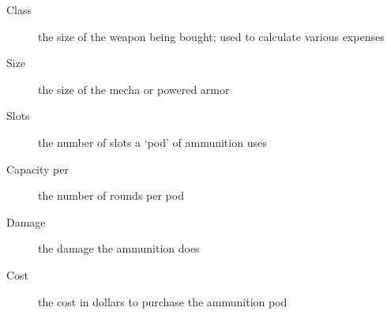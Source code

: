 \documentclass[twoside]{book}
\begin{document}
\begin{description}
    
  \item[ Class ] 
    {  
      the size of the weapon being bought; used to
                 calculate various expenses 
    }
  
  \item[ Size ] 
    {  
      the size of the mecha or powered armor 
    }
  
  \item[ Slots ] 
    {  
      the number of slots a `pod' of
                 ammunition uses 
    }
  
  \item[ Capacity per ] 
    {  
      the number of rounds per pod 
    }
  
  \item[ Damage ] 
    {  
      the damage the ammunition does 
    }
  
  \item[ Cost ] 
    {  
      the cost in dollars to purchase the ammunition
                 pod 
    }
  
\end{description}
  
\end{document}
